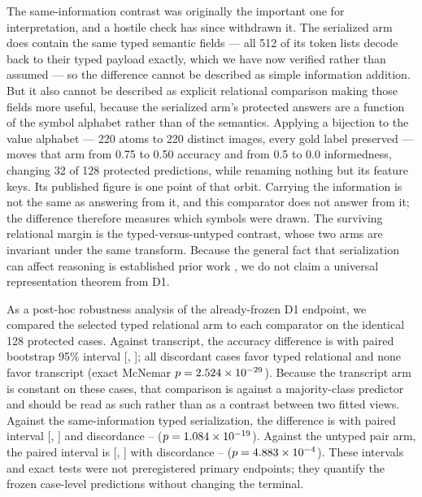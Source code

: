 The same-information contrast was originally the important one for interpretation, and a hostile check has since withdrawn it. The serialized arm does contain the same typed semantic fields --- all 512 of its token lists decode back to their typed payload exactly, which we have now verified rather than assumed --- so the \DOneTypedMinusSerialized{} difference cannot be described as simple information addition. But it also cannot be described as explicit relational comparison making those fields more useful, because the serialized arm's protected answers are a function of the symbol alphabet rather than of the semantics. Applying a bijection to the value alphabet --- 220 atoms to 220 distinct images, every gold label preserved --- moves that arm from 0.75 to 0.50 accuracy and from 0.5 to 0.0 informedness, changing 32 of 128 protected predictions, while renaming nothing but its feature keys. Its published figure is one point of that orbit. Carrying the information is not the same as answering from it, and this comparator does not answer from it; the difference therefore measures which symbols were drawn. The surviving relational margin is the typed-versus-untyped contrast, whose two arms are invariant under the same transform. Because the general fact that serialization can affect reasoning is established prior work \citep{lo2026serialization}, we do not claim a universal representation theorem from D1.

As a post-hoc robustness analysis of the already-frozen D1 endpoint, we compared the selected typed relational arm to each comparator on the identical 128 protected cases. Against transcript, the accuracy difference is \DOneTypedMinusTranscript{} with paired bootstrap 95\% interval [\DOneTranscriptPairedCILow, \DOneTranscriptPairedCIHigh]; all \DOneTranscriptDiscordantWins{} discordant cases favor typed relational and none favor transcript (exact McNemar $p=2.524\times 10^{-29}$). Because the transcript arm is constant on these cases, that comparison is against a majority-class predictor and should be read as such rather than as a contrast between two fitted views. Against the same-information typed serialization, the difference is \DOneTypedMinusSerialized{} with paired interval [\DOneSerializedPairedCILow, \DOneSerializedPairedCIHigh] and discordance \DOneSerializedDiscordantWins{}--\DOneSerializedDiscordantLosses{} ($p=1.084\times 10^{-19}$). Against the untyped pair arm, the paired interval is [\DOneUntypedPairedCILow, \DOneUntypedPairedCIHigh] with discordance \DOneUntypedDiscordantWins{}--\DOneUntypedDiscordantLosses{} ($p=4.883\times 10^{-4}$). These intervals and exact tests were not preregistered primary endpoints; they quantify the frozen case-level predictions without changing the terminal.

